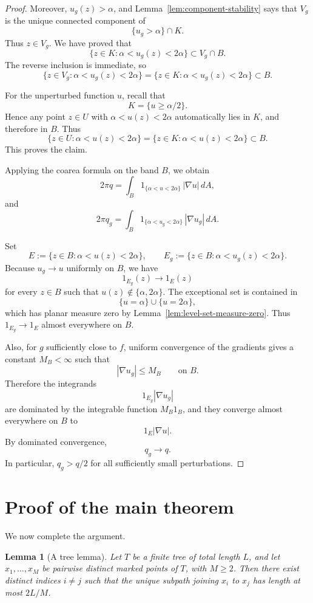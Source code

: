 \documentclass[12pt]{amsart}
\theoremstyle{definition}
\newtheorem{lemma}[theorem]{Lemma}
\theoremstyle{remark}
\begin{document}
\begin{proof}
Moreover, $u_g(z)>\alpha$, and Lemma~\ref{lem:component-stability} says that $V_g$ is the
unique connected component of
\[
\{u_g>\alpha\}\cap K.
\]
Thus $z\in V_g$. We have proved that
\[
\{z\in K : \alpha<u_g(z)<2\alpha\}\subset V_g\cap B.
\]
The reverse inclusion is immediate, so
\[
\{z\in V_g : \alpha<u_g(z)<2\alpha\}
=
\{z\in K : \alpha<u_g(z)<2\alpha\}
\subset B.
\]

For the unperturbed function $u$, recall that
\[
K=\{u\ge \alpha/2\}.
\]
Hence any point $z\in U$ with $\alpha<u(z)<2\alpha$ automatically lies in $K$, and
therefore in $B$. Thus
\[
\{z\in U : \alpha<u(z)<2\alpha\}
=
\{z\in K : \alpha<u(z)<2\alpha\}
\subset B.
\]
This proves the claim.
\medskip

Applying the coarea formula on the band $B$, we obtain
\[
2\pi q=\int_B 1_{\{\alpha<u<2\alpha\}}\,|\nabla u|\,dA,
\]
and
\[
2\pi q_g=\int_B 1_{\{\alpha<u_g<2\alpha\}}\,|\nabla u_g|\,dA.
\]

Set
\[
E:=\{z\in B:\alpha<u(z)<2\alpha\},
\qquad
E_g:=\{z\in B:\alpha<u_g(z)<2\alpha\}.
\]
Because $u_g\to u$ uniformly on $B$, we have
\[
1_{E_g}(z)\to 1_E(z)
\]
for every $z\in B$ such that $u(z)\notin\{\alpha,2\alpha\}$. The exceptional set is
contained in
\[
\{u=\alpha\}\cup\{u=2\alpha\},
\]
which has planar measure zero by Lemma~\ref{lem:level-set-measure-zero}. Thus $1_{E_g}\to 1_E$ almost everywhere
on $B$.

Also, for $g$ sufficiently close to $f$, uniform convergence of the gradients gives a
constant $M_B<\infty$ such that
\[
|\nabla u_g|\le M_B \qquad\text{on }B.
\]
Therefore the integrands
\[
1_{E_g}|\nabla u_g|
\]
are dominated by the integrable function $M_B1_B$, and they converge almost
everywhere on $B$ to
\[
1_E|\nabla u|.
\]
By dominated convergence,
\[
q_g\to q.
\]
In particular, $q_g>q/2$ for all sufficiently small perturbations.
\end{proof}


\section{Proof of the main theorem}

We now complete the argument.

\medskip
\begin{lemma}[A tree lemma]\label{lem:tree-lemma}
\emph{Let $T$ be a finite tree of total length $L$, and let $x_1,\dots,x_M$ be
pairwise distinct marked points of $T$, with $M\ge 2$. Then there exist
distinct indices $i\neq j$ such that the unique subpath joining $x_i$ to $x_j$
has length at most $2L/M$.}
\end{lemma}
\end{document}
